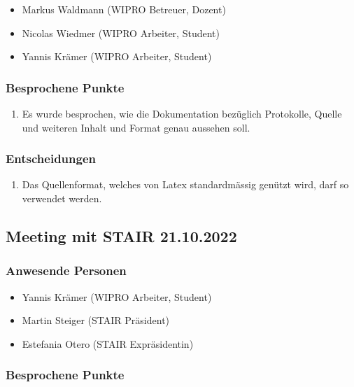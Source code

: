 \documentclass[a4paper, table]{article}
\begin{document}
\begin{itemize}
    \item Markus Waldmann (WIPRO Betreuer, Dozent)
    \item Nicolas Wiedmer (WIPRO Arbeiter, Student)
    \item Yannis Krämer (WIPRO Arbeiter, Student)
\end{itemize}

\subsubsection*{Besprochene Punkte}

\begin{enumerate}
    \item Es wurde besprochen, wie die Dokumentation bezüglich Protokolle, Quelle und weiteren Inhalt und Format genau aussehen soll.
\end{enumerate}

\subsubsection*{Entscheidungen}

\begin{enumerate}
    \item Das Quellenformat, welches von Latex standardmässig genützt wird, darf so verwendet werden.
\end{enumerate}

\newpage
\subsection{Meeting mit STAIR 21.10.2022}

\subsubsection*{Anwesende Personen}

\begin{itemize}
    \item Yannis Krämer (WIPRO Arbeiter, Student)
    \item Martin Steiger (STAIR Präsident)
    \item Estefania Otero (STAIR Expräsidentin)
\end{itemize}

\subsubsection*{Besprochene Punkte}
\end{document}
